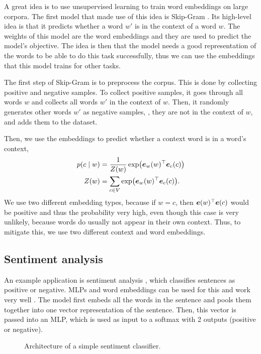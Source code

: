 A great idea is to use unsupervised learning to train word embeddings on large
corpora. The first model that made
use of this idea is Skip-Gram \citep{mikolov2013efficient}. Its high-level idea
is that it predicts whether a word $w'$ is in the context of a word
$w$. The weights
of this model are the word embeddings and they are used to predict the model's
objective. The idea is then that the model needs a good representation of the
words to be able to do this task successfully, thus we can use the embeddings
that this model trains for other tasks.

The first step of Skip-Gram is to preprocess the corpus. This is done by
collecting positive and negative samples. To collect positive samples,
it goes through all words $w$ and collects all words $w'$ in the context of
$w$. Then, it randomly generates other words $w'$ as negative samples, \ie,
they are not in the context of $w$, and adds them to the dataset.

Then, we use the embeddings to predict whether a context word is in a word's
context,
\begin{align*}
  p(c\mid w) &= \frac{1}{Z(w)} \exp \lft( \transpose{\vec{e}_w(w)} \vec{e}_c(c) \rgt) \\
  Z(w) &= \sum_{c \in V} \exp \lft( \transpose{\vec{e}_w(w)} \vec{e}_c(c) \rgt)
.\end{align*}
We use two different embedding types, because if $w=c$, then
$\bm{e}(w)^\top \bm{e}(c)$ would be positive and thus the probability
very high, even though this case is very unlikely, because words do usually not
appear in their own context. Thus, to mitigate this, we use two different
context and word embeddings.

\subsection{Sentiment analysis}

An example application is sentiment analysis \citep{pang2008opinion}, which
classifies sentences as positive or negative. MLPs and word embeddings can be
used for this and work very well \citep{iyyer2015deep}. The model first embeds
all the words in the sentence and pools them together into one vector
representation of the sentence. Then, this vector is
passed into an MLP, which is used as input to a softmax with 2 outputs
(positive or negative).

\begin{figure}[h!]
    \centering
    \caption{Architecture of a simple sentiment classifier.}
    \label{fig:sentiment-analysis}
\end{figure}
